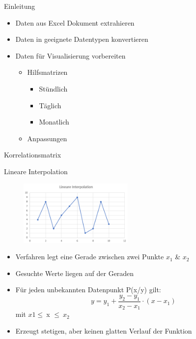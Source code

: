 \begin{frame}{Einleitung}
\begin{itemize}
	\item Daten aus Excel Dokument extrahieren
	\item Daten in geeignete Datentypen konvertieren
	\item Daten für Visualisierung vorbereiten
	\begin{itemize}
		\item Hilfsmatrizen
		\begin{itemize}
			\item Stündlich
			\item Täglich
			\item Monatlich
		\end{itemize}
		\item Anpassungen
	\end{itemize}
\end{itemize}
\end{frame}

\begin{frame}{Korrelationsmatrix}
	

\end{frame}

\begin{frame}{Lineare Interpolation}
\begin{figure}
  \centering
     \includegraphics[width=0.5\textwidth]{pics/linear.png}
  \label{fig:Bild1}
\end{figure}
\begin{itemize}
\item Verfahren legt eine Gerade zwischen zwei Punkte $x_1$ \& $x_2$
\item Gesuchte Werte liegen auf der Geraden
\item Für jeden unbekannten Datenpunkt P(x/y) gilt:
$$y = y_1 + \frac{y_2 - y_1}{x_2 - x_1} \cdot (x - x_1)$$
mit $x1\leq\ $x $\leq \ x_2$
\item Erzeugt stetigen, aber keinen glatten Verlauf der Funktion
\end{itemize}
\end{frame}

